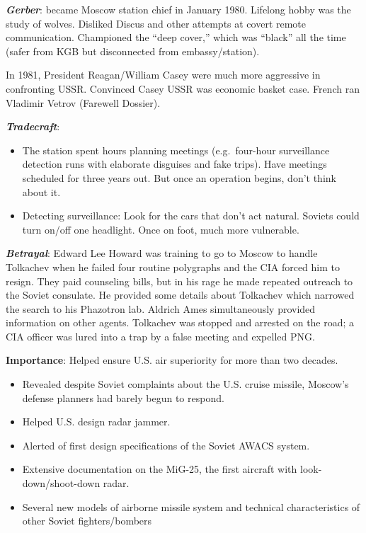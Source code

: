 \documentclass[
]{article}
\begin{document}
\textbf{\emph{Gerber}}: became Moscow station chief in January 1980.
Lifelong hobby was the study of wolves. Disliked Discus and other
attempts at covert remote communication. Championed the ``deep cover,''
which was ``black'' all the time (safer from KGB but disconnected from
embassy/station).

In 1981, President Reagan/William Casey were much more aggressive in
confronting USSR. Convinced Casey USSR was economic basket case. French
ran Vladimir Vetrov (Farewell Dossier).

\textbf{\emph{Tradecraft}}:

\begin{itemize}
\item
  The station spent hours planning meetings (e.g.~four-hour surveillance
  detection runs with elaborate disguises and fake trips). Have meetings
  scheduled for three years out. But once an operation begins, don't
  think about it.
\item
  Detecting surveillance: Look for the cars that don't act natural.
  Soviets could turn on/off one headlight. Once on foot, much more
  vulnerable.
\end{itemize}

\textbf{\emph{Betrayal}}: Edward Lee Howard was training to go to Moscow
to handle Tolkachev when he failed four routine polygraphs and the CIA
forced him to resign. They paid counseling bills, but in his rage he
made repeated outreach to the Soviet consulate. He provided some details
about Tolkachev which narrowed the search to his Phazotron lab. Aldrich
Ames simultaneously provided information on other agents. Tolkachev was
stopped and arrested on the road; a CIA officer was lured into a trap by
a false meeting and expelled PNG.

\textbf{Importance}: Helped ensure U.S. air superiority for more than
two decades.

\begin{itemize}
\item
  Revealed despite Soviet complaints about the U.S. cruise missile,
  Moscow's defense planners had barely begun to respond.
\item
  Helped U.S. design radar jammer.
\item
  Alerted of first design specifications of the Soviet AWACS system.
\item
  Extensive documentation on the MiG-25, the first aircraft with
  look-down/shoot-down radar.
\item
  Several new models of airborne missile system and technical
  characteristics of other Soviet fighters/bombers
\end{itemize}
\end{document}
